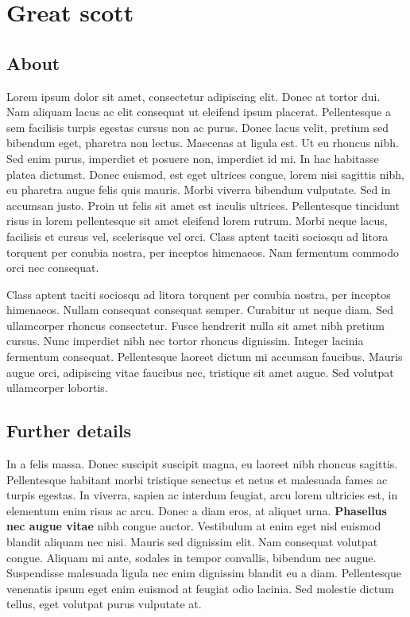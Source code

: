 





\frontmatter
        \tableofcontents

\mainmatter
\chapter{Great scott}
\section{About}
Lorem ipsum dolor sit amet, consectetur adipiscing elit. Donec at tortor dui. Nam aliquam lacus ac elit consequat ut eleifend ipsum placerat. Pellentesque a sem facilisis turpis egestas cursus non ac purus. Donec lacus velit, pretium sed bibendum eget, pharetra non lectus. Maecenas at ligula est. Ut eu rhoncus nibh. Sed enim purus, imperdiet et posuere non, imperdiet id mi. In hac habitasse platea dictumst. Donec euismod, est eget ultrices congue, lorem nisi sagittis nibh, eu pharetra augue felis quis mauris. Morbi viverra bibendum vulputate. Sed in accumsan justo. Proin ut felis sit amet est iaculis ultrices. Pellentesque tincidunt risus in lorem pellentesque sit amet eleifend lorem rutrum. Morbi neque lacus, facilisis et cursus vel, scelerisque vel orci. Class aptent taciti sociosqu ad litora torquent per conubia nostra, per inceptos himenaeos. Nam fermentum commodo orci nec consequat.

Class aptent taciti sociosqu ad litora torquent per conubia nostra, per inceptos himenaeos. Nullam consequat consequat semper. Curabitur ut neque diam. Sed ullamcorper rhoncus consectetur. Fusce hendrerit nulla sit amet nibh pretium cursus. Nunc imperdiet nibh nec tortor rhoncus dignissim. Integer lacinia fermentum consequat. Pellentesque laoreet dictum mi accumsan faucibus. Mauris augue orci, adipiscing vitae faucibus nec, tristique sit amet augue. Sed volutpat ullamcorper lobortis.

\section{Further details}
In a felis massa. Donec suscipit suscipit magna, eu laoreet nibh rhoncus sagittis. Pellentesque habitant morbi tristique senectus et netus et malesuada fames ac turpis egestas. In viverra, sapien ac interdum feugiat, arcu lorem ultricies est, in elementum enim risus ac arcu. Donec a diam eros, at aliquet urna. \textbf{Phasellus nec augue vitae} nibh congue auctor. Vestibulum at enim eget nisl euismod blandit aliquam nec nisi. Mauris sed dignissim elit. Nam consequat volutpat congue. Aliquam mi ante, sodales in tempor convallis, bibendum nec augue. Suspendisse malesuada ligula nec enim dignissim blandit eu a diam. Pellentesque venenatis ipsum eget enim euismod at feugiat odio lacinia. Sed molestie dictum tellus, eget volutpat purus vulputate at.

